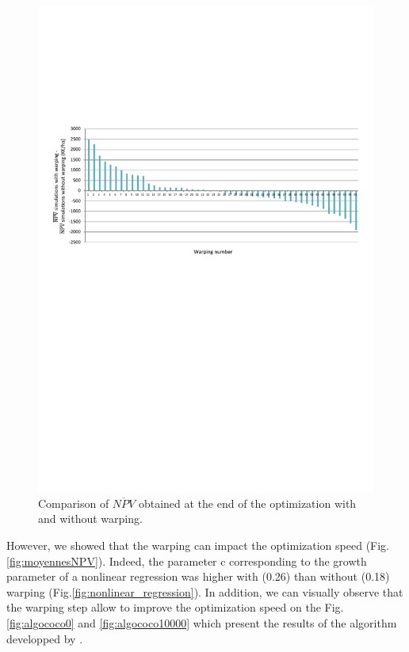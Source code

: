 \begin{figure}[!ht]
	\centering
	\includegraphics[trim = 0cm 11cm 0cm 6cm, clip, width=\textwidth]{Figures_Warping_resultats_warping_moins_sanswarping.pdf}
	\caption{Comparison of $\overline{NPV}$ obtained at the end of the optimization with and without warping. }\label{fig:waping_moins_sanswarping}
\end{figure}

However, we showed that the warping can impact the optimization speed (Fig.\ref{fig:moyennesNPV}). 
Indeed, the parameter c corresponding to the growth parameter of a nonlinear regression was higher with (0.26) than without (0.18) warping (Fig.\ref{fig:nonlinear_regression}). 
In addition, we can visually observe that the warping step allow to improve the optimization speed on the Fig.\ref{fig:algococo0} and \ref{fig:algococo10000} 
which present the results of the algorithm developped by .

